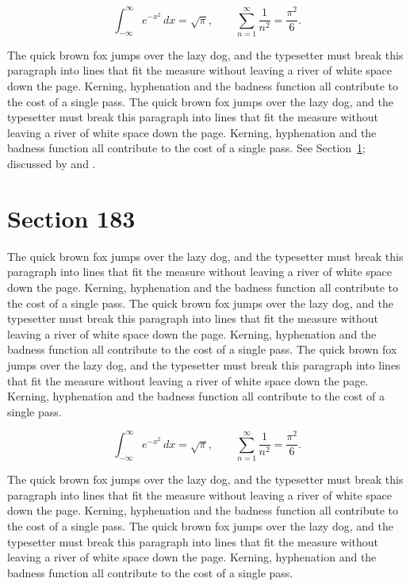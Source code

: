 \documentclass{article}
\begin{document}
\begin{equation}\label{eq:182}
\int_{-\infty}^{\infty} e^{-x^{2}}\,dx = \sqrt{\pi}, \qquad
\sum_{n=1}^{\infty} \frac{1}{n^{2}} = \frac{\pi^{2}}{6}.
\end{equation}

The quick brown fox jumps over the lazy dog, and the typesetter must break this paragraph into lines that fit the measure without leaving a river of white space down the page. Kerning, hyphenation and the badness function all contribute to the cost of a single pass. The quick brown fox jumps over the lazy dog, and the typesetter must break this paragraph into lines that fit the measure without leaving a river of white space down the page. Kerning, hyphenation and the badness function all contribute to the cost of a single pass. 
See Section~\ref{sec:183}; discussed by \textcite{k3} and \textcite{l5}.
\section{Section 183}
\label{sec:183}
The quick brown fox jumps over the lazy dog, and the typesetter must break this paragraph into lines that fit the measure without leaving a river of white space down the page. Kerning, hyphenation and the badness function all contribute to the cost of a single pass. The quick brown fox jumps over the lazy dog, and the typesetter must break this paragraph into lines that fit the measure without leaving a river of white space down the page. Kerning, hyphenation and the badness function all contribute to the cost of a single pass. The quick brown fox jumps over the lazy dog, and the typesetter must break this paragraph into lines that fit the measure without leaving a river of white space down the page. Kerning, hyphenation and the badness function all contribute to the cost of a single pass. 

\begin{equation}\label{eq:183}
\int_{-\infty}^{\infty} e^{-x^{2}}\,dx = \sqrt{\pi}, \qquad
\sum_{n=1}^{\infty} \frac{1}{n^{2}} = \frac{\pi^{2}}{6}.
\end{equation}

The quick brown fox jumps over the lazy dog, and the typesetter must break this paragraph into lines that fit the measure without leaving a river of white space down the page. Kerning, hyphenation and the badness function all contribute to the cost of a single pass. The quick brown fox jumps over the lazy dog, and the typesetter must break this paragraph into lines that fit the measure without leaving a river of white space down the page. Kerning, hyphenation and the badness function all contribute to the cost of a single pass. 
\end{document}
